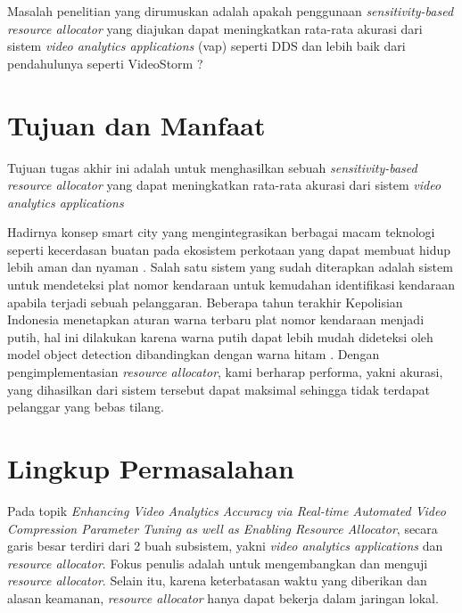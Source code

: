 Masalah penelitian yang dirumuskan adalah apakah penggunaan \textit{sensitivity-based resource allocator} yang diajukan dapat meningkatkan 
rata-rata akurasi dari sistem \textit{video analytics applications} (\gls{vap}) seperti DDS \citep{dds} dan lebih baik dari pendahulunya seperti VideoStorm \citep{videostorm}?
\section{Tujuan dan Manfaat}

Tujuan tugas akhir ini adalah untuk menghasilkan sebuah \textit{sensitivity-based resource allocator} yang dapat meningkatkan
rata-rata akurasi dari sistem \textit{video analytics applications}

Hadirnya konsep smart city yang mengintegrasikan berbagai macam teknologi seperti kecerdasan buatan pada ekosistem
perkotaan yang dapat membuat hidup lebih aman dan nyaman \citep{smartCity}. Salah satu sistem yang sudah
diterapkan adalah sistem untuk mendeteksi plat nomor kendaraan untuk kemudahan identifikasi
kendaraan apabila terjadi sebuah pelanggaran. Beberapa tahun terakhir Kepolisian Indonesia
menetapkan aturan warna terbaru plat nomor kendaraan menjadi putih, hal ini dilakukan karena
warna putih dapat lebih mudah dideteksi oleh model object detection dibandingkan dengan
warna hitam \citep{plat}. Dengan pengimplementasian \textit{resource allocator}, kami berharap
performa, yakni akurasi, yang dihasilkan dari sistem tersebut dapat maksimal sehingga tidak terdapat pelanggar yang bebas tilang.

\section{Lingkup Permasalahan}

Pada topik \textit{Enhancing Video Analytics Accuracy via
Real-time Automated Video Compression Parameter Tuning as
well as Enabling Resource Allocator}, secara garis besar terdiri dari 2 buah subsistem, yakni \textit{video analytics applications} dan \textit{resource allocator}.
Fokus penulis adalah untuk mengembangkan dan menguji \textit{resource allocator}. 
Selain itu, karena keterbatasan waktu yang diberikan dan alasan keamanan,
\textit{resource allocator} hanya dapat bekerja dalam jaringan lokal.


